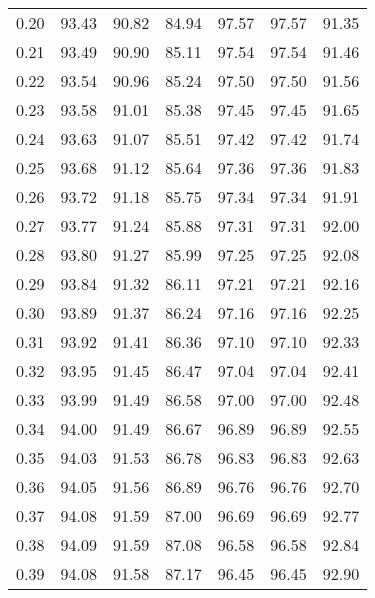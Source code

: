 \begin{tabular}{|c|c|c|c|c|c|c|}
      0.20 &     93.43 &     90.82 &      84.94 &   97.57 &      97.57 &         91.35 \\
      0.21 &     93.49 &     90.90 &      85.11 &   97.54 &      97.54 &         91.46 \\
      0.22 &     93.54 &     90.96 &      85.24 &   97.50 &      97.50 &         91.56 \\
      0.23 &     93.58 &     91.01 &      85.38 &   97.45 &      97.45 &         91.65 \\
      0.24 &     93.63 &     91.07 &      85.51 &   97.42 &      97.42 &         91.74 \\
      0.25 &     93.68 &     91.12 &      85.64 &   97.36 &      97.36 &         91.83 \\
      0.26 &     93.72 &     91.18 &      85.75 &   97.34 &      97.34 &         91.91 \\
      0.27 &     93.77 &     91.24 &      85.88 &   97.31 &      97.31 &         92.00 \\
      0.28 &     93.80 &     91.27 &      85.99 &   97.25 &      97.25 &         92.08 \\
      0.29 &     93.84 &     91.32 &      86.11 &   97.21 &      97.21 &         92.16 \\
      0.30 &     93.89 &     91.37 &      86.24 &   97.16 &      97.16 &         92.25 \\
      0.31 &     93.92 &     91.41 &      86.36 &   97.10 &      97.10 &         92.33 \\
      0.32 &     93.95 &     91.45 &      86.47 &   97.04 &      97.04 &         92.41 \\
      0.33 &     93.99 &     91.49 &      86.58 &   97.00 &      97.00 &         92.48 \\
      0.34 &     94.00 &     91.49 &      86.67 &   96.89 &      96.89 &         92.55 \\
      0.35 &     94.03 &     91.53 &      86.78 &   96.83 &      96.83 &         92.63 \\
      0.36 &     94.05 &     91.56 &      86.89 &   96.76 &      96.76 &         92.70 \\
      0.37 &     94.08 &     91.59 &      87.00 &   96.69 &      96.69 &         92.77 \\
      0.38 &     94.09 &     91.59 &      87.08 &   96.58 &      96.58 &         92.84 \\
      0.39 &     94.08 &     91.58 &      87.17 &   96.45 &      96.45 &         92.90 \\

\end{tabular}
